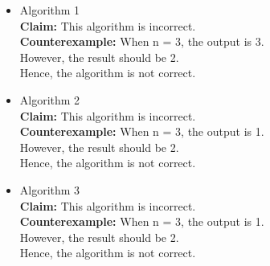 \documentclass[12pt]{article}
\begin{document}
\begin{itemize}
            
    \item Algorithm 1\\
        \textbf{Claim:} This algorithm is incorrect.\\
        \textbf{Counterexample:} When n = 3, the output is 3.\\
        However, the result should be 2.\\
        Hence, the algorithm is not correct.

    \item Algorithm 2\\
        \textbf{Claim:} This algorithm is incorrect.\\
        \textbf{Counterexample:} When n = 3, the output is 1.\\
        However, the result should be 2.\\
        Hence, the algorithm is not correct.
    
    \item Algorithm 3\\
        \textbf{Claim:} This algorithm is incorrect.\\
        \textbf{Counterexample:} When n = 3, the output is 1.\\
        However, the result should be 2.\\
        Hence, the algorithm is not correct.

\end{itemize}
\end{document}
